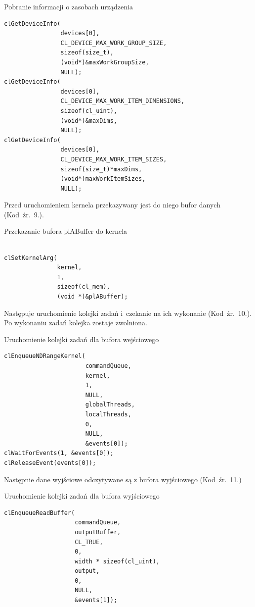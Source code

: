 \begin{program}[H]
\caption{Pobranie informacji o zasobach urządzenia}
\begin{lstlisting}
clGetDeviceInfo(
                devices[0], 
                CL_DEVICE_MAX_WORK_GROUP_SIZE, 
                sizeof(size_t), 
                (void*)&maxWorkGroupSize, 
                NULL);
clGetDeviceInfo(
                devices[0], 
                CL_DEVICE_MAX_WORK_ITEM_DIMENSIONS, 
                sizeof(cl_uint), 
                (void*)&maxDims, 
                NULL);
clGetDeviceInfo(
                devices[0], 
                CL_DEVICE_MAX_WORK_ITEM_SIZES, 
                sizeof(size_t)*maxDims,
                (void*)maxWorkItemSizes,
                NULL);
\end{lstlisting}
\end{program}

Przed uruchomieniem kernela przekazywany jest do niego bufor danych (Kod~źr.~9.).

\begin{program}[H]
\caption{Przekazanie bufora plABuffer do kernela}
\begin{lstlisting}

clSetKernelArg(
               kernel, 
               1, 
               sizeof(cl_mem), 
               (void *)&plABuffer);
\end{lstlisting}
\end{program}

Następuje uruchomienie kolejki zadań i~czekanie na ich wykonanie (Kod~źr.~10.). Po wykonaniu zadań kolejka zostaje zwolniona.

\begin{program}[H]
\caption{Uruchomienie kolejki zadań dla bufora wejściowego}
\begin{lstlisting}
clEnqueueNDRangeKernel(
                       commandQueue,
                       kernel,
                       1,
                       NULL,
                       globalThreads,
                       localThreads,
                       0,
                       NULL,
                       &events[0]);
clWaitForEvents(1, &events[0]);
clReleaseEvent(events[0]);
\end{lstlisting}
\end{program}

Następnie dane wyjściowe odczytywane są z bufora wyjściowego (Kod~źr.~11.)

\begin{program}[H]
\caption{Uruchomienie kolejki zadań dla bufora wyjściowego}
\begin{lstlisting}
clEnqueueReadBuffer(
                    commandQueue,
                    outputBuffer,
                    CL_TRUE,
                    0,
                    width * sizeof(cl_uint),
                    output,
                    0,
                    NULL,
                    &events[1]);
\end{lstlisting}
\end{program}


